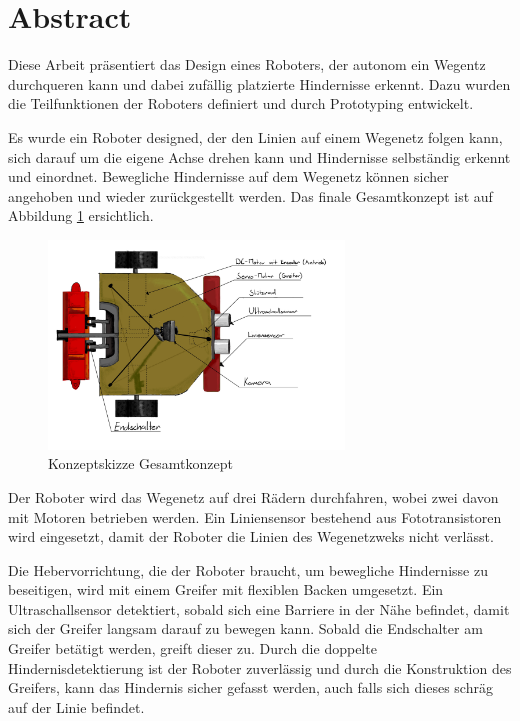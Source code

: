 \section*{Abstract}

Diese Arbeit präsentiert das Design eines Roboters, der autonom ein Wegentz durchqueren kann und dabei zufällig platzierte Hindernisse erkennt. Dazu wurden die Teilfunktionen der Roboters definiert und durch Prototyping entwickelt.

Es wurde ein Roboter designed, der den Linien auf einem Wegenetz folgen kann, sich darauf um die eigene Achse drehen kann und Hindernisse selbständig erkennt und einordnet. Bewegliche Hindernisse auf dem Wegenetz können sicher angehoben und wieder zurückgestellt werden.  Das finale Gesamtkonzept ist auf Abbildung \ref{fig:robot_concept-scetch_labeld-abstract} ersichtlich.

\begin{figure}[H]
\centering
\includegraphics[width=0.7\textwidth]{assets/gesamtkonzept/Skizze-Fahrzeugkonzept-Beschriftet.jpg}
\caption{Konzeptskizze Gesamtkonzept}
\label{fig:robot_concept-scetch_labeld-abstract}
\end{figure}

Der Roboter wird das Wegenetz auf drei Rädern durchfahren, wobei zwei davon mit Motoren betrieben werden. Ein Liniensensor bestehend aus Fototransistoren wird eingesetzt, damit der Roboter die Linien des Wegenetzweks nicht verlässt.

Die Hebervorrichtung, die der Roboter braucht, um bewegliche Hindernisse zu beseitigen, wird mit einem Greifer mit flexiblen Backen umgesetzt. Ein Ultraschallsensor detektiert, sobald sich eine Barriere in der Nähe befindet, damit sich der Greifer langsam darauf zu bewegen kann. Sobald die Endschalter am Greifer betätigt werden, greift dieser zu. Durch die doppelte Hindernisdetektierung ist der Roboter zuverlässig und durch die Konstruktion des Greifers, kann das Hindernis sicher gefasst werden, auch falls sich dieses schräg auf der Linie befindet.

